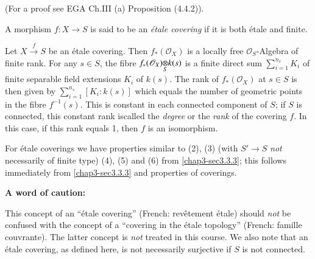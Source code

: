 (For a proof see EGA Ch.III (a) Proposition (4.4.2)).

\begin{defi*}
A morphism $f:X\to S$ is said to be an {\em \'etale covering} if it is
both \'etale and finite.
\end{defi*}

Let $X\xrightarrow{f}S$ be an \'etale covering. Then
$f_{\ast}(\mathscr{O}_{X})$ is a locally free
$\mathscr{O}_{S}$-Algebra of finite rank. For any $s\in S$, the fibre
$\foprod{f_{\ast}(\mathscr{O}_{X})}{k(s)}{S}$ is a finite direct sum
$\sum\limits^{n_{s}}_{i=1}K_{i}$ of finite separable field extensions
$K_{i}$ of $k(s)$. The rank of $f_{\ast}(\mathscr{O}_{X})$ at $s\in S$
is then given by $\sum\limits^{n_{s}}_{i=1}[K_{i}:k(s)]$ which equals
the number of geometric points in the fibre $f^{-1}(s)$. This is
constant in each connected component of $S$; if $S$ is connected, this
constant rank is\pageoriginale called the {\em degree} or the {\em
  rank} of the covering $f$. In this case, if this rank equals 1, then
$f$ is an isomorphism.

\begin{note*}
For \'etale coverings we have properties similar to (2), (3) (with
$S'\to S$ {\em not} necessarily of finite type) (4), (5) and (6) from
\ref{chap3-sec3.3.3}; this follows immediately from \ref{chap3-sec3.3.3} and
properties of coverings.
\end{note*}

\medskip
\noindent
{\bf A word of caution:}
\smallskip

This concept of an ``\'etale covering'' (French: rev\^etement
\'etale)\break 
should {\em not} be confused with the concept of a ``covering in the
\'etale topology'' (French: famille couvrante). The latter concept is
        {\em not} treated in this course. We also note that an \'etale
        covering, as defined here, is not necessarily surjective if
        $S$ is not connected.



